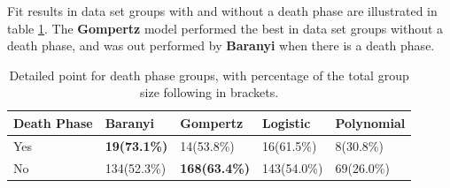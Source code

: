\documentclass[11pt]{article}
\begin{document}
Fit results in data set groups with and without a death phase are illustrated in table \ref{tab: deathfit}. The \textbf{Gompertz} model performed the best in data set groups without a death phase, and was out performed by \textbf{Baranyi} when there is a death phase.
\FloatBarrier
\begin{table}[!htbp]
\begin{tabularx}{\linewidth}{X X X X X}
\toprule  Death Phase & Baranyi & Gompertz & Logistic & Polynomial \\
\midrule
Yes & \textbf{19(73.1\%)} & 14(53.8\%) & 16(61.5\%) & 8(30.8\%)  \\
No & 134(52.3\%) & \textbf{168(63.4\%)} & 143(54.0\%) & 69(26.0\%)  \\
\bottomrule
\end{tabularx}
\caption{Detailed point for death phase groups, with percentage of the total group size following in brackets.}
\label{tab: deathfit}
\end{table}          
\FloatBarrier
\end{document}
